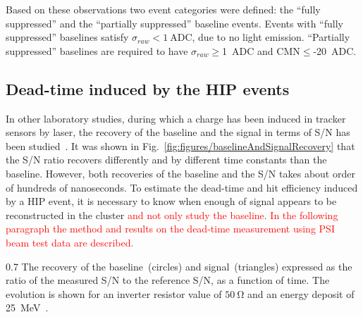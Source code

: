 Based on these observations two event categories were defined: the ``fully suppressed'' and the ``partially suppressed'' baseline events. Events with ``fully suppressed'' baselines satisfy $\sigma_{raw}< 1~\mathrm{ADC}$, due to no light emission. ``Partially suppressed'' baselines are required to have $\sigma_{raw}\geq$1~ADC and CMN$\leq$-20~ADC.

\subsection{Dead-time induced by the HIP events~\label{sec:deadtimePast}}

In other laboratory studies, during which a charge has been induced in tracker sensors by laser, the recovery of the  baseline and the signal in terms of S/N has been studied~\cite{Adam:2005pz}. It was shown in Fig.~\ref{fig:figures/baselineAndSignalRecovery} that the S/N ratio recovers differently and by different time constants than the baseline. However, both recoveries of the baseline and the S/N takes about order of hundreds of nanoseconds. To estimate the dead-time and hit efficiency induced by a HIP event, it is necessary to know when enough of signal appears to be reconstructed in the cluster \textcolor{red}{and not only study the baseline. In the following paragraph the method and results on the dead-time measurement using PSI beam test data are described.}

                 {0.7}       %
                 {The recovery of the baseline~(circles) and signal~(triangles) expressed as the ratio of the measured S/N to the reference S/N, as a function of time. The evolution is shown for an inverter resistor value of $50~\mathrm{\Omega}$ and an energy deposit of 25~MeV~\cite{Adam:2005pz}.} %

